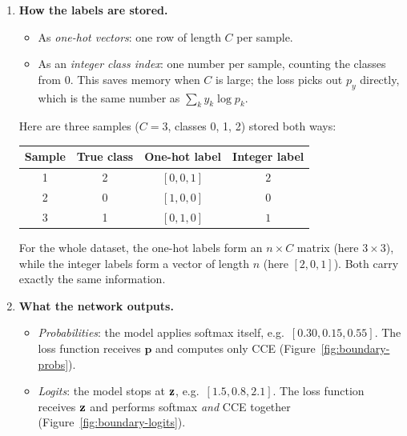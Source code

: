 \documentclass[12pt, a4paper]{article}
\providecommand{\bp}{\mathbf{p}}
\begin{document}
\begin{enumerate}
  \item \textbf{How the labels are stored.}
        \begin{itemize}[nosep]
          \item As \emph{one-hot vectors}: one row of length $C$ per sample.
          \item As an \emph{integer class index}: one number per sample,
                counting the classes from 0. This saves memory when $C$ is
                large; the loss picks out $p_y$ directly, which is the same
                number as $\sum_k y_k \log p_k$.
        \end{itemize}
        Here are three samples ($C = 3$, classes 0, 1, 2) stored both ways:
        \begin{center}
          \renewcommand{\arraystretch}{1.25}
          \begin{tabular}{cccc}
            \toprule
            Sample & True class & One-hot label & Integer label \\
            \midrule
            1      & 2          & $[0, 0, 1]$   & $2$           \\
            2      & 0          & $[1, 0, 0]$   & $0$           \\
            3      & 1          & $[0, 1, 0]$   & $1$           \\
            \bottomrule
          \end{tabular}
        \end{center}
        For the whole dataset, the one-hot labels form an $n \times C$ matrix
        (here $3 \times 3$), while the integer labels form a vector of
        length $n$ (here $[2, 0, 1]$). Both carry exactly the same
        information.
  \item \textbf{What the network outputs.}
        \begin{itemize}[nosep]
          \item \emph{Probabilities}: the model applies softmax itself,
                e.g.\ $[0.30, 0.15, 0.55]$. The loss function receives
                $\bp$ and computes only CCE
                (Figure~\ref{fig:boundary-probs}).
          \item \emph{Logits}: the model stops at $\mathbf{z}$,
                e.g.\ $[1.5, 0.8, 2.1]$. The loss function receives $\mathbf{z}$
                and performs softmax \emph{and} CCE together
                (Figure~\ref{fig:boundary-logits}).
        \end{itemize}
\end{enumerate}
\end{document}
